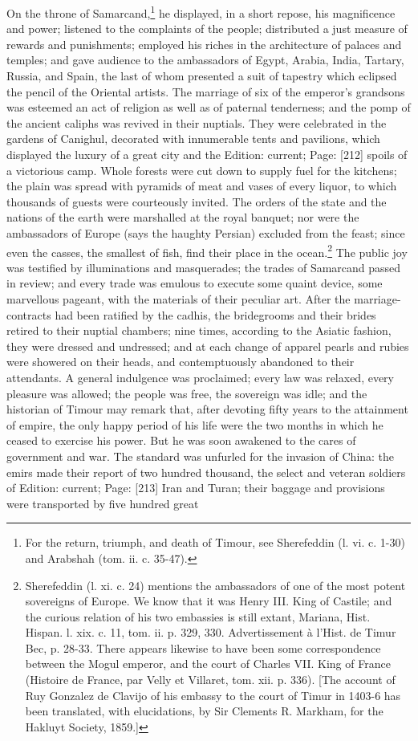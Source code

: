 On the throne of Samarcand,\footnote{For the return, triumph, and death of Timour, see Sherefeddin (l. vi. c. 1-30) and Arabshah (tom. ii. c. 35-47).} he displayed, in a short repose, his magnificence and power; listened to the complaints of the people; distributed a just measure of rewards and punishments; employed his riches in the architecture of palaces and temples; and gave audience to the ambassadors of Egypt, Arabia, India, Tartary, Russia, and Spain, the last of whom presented a suit of tapestry which eclipsed the pencil of the Oriental artists. The marriage of six of the emperor\texthebrew{}’s grandsons was esteemed an act of religion as well as of paternal tenderness; and the pomp of the ancient caliphs was revived in their nuptials. They were celebrated in the gardens of Canighul, decorated with innumerable tents and pavilions, which displayed the luxury of a great city and the Edition: current; Page: [212] spoils of a victorious camp. Whole forests were cut down to supply fuel for the kitchens; the plain was spread with pyramids of meat and vases of every liquor, to which thousands of guests were courteously invited. The orders of the state and the nations of the earth were marshalled at the royal banquet; nor were the ambassadors of Europe (says the haughty Persian) excluded from the feast; since even the casses, the smallest of fish, find their place in the ocean.\footnote{Sherefeddin (l. xi. c. 24) mentions the ambassadors of one of the most potent sovereigns of Europe. We know that it was Henry III. King of Castile; and the curious relation of his two embassies is still extant, Mariana, Hist. Hispan. l. xix. c. 11, tom. ii. p. 329, 330. Advertissement à l\texthebrew{}’Hist. de Timur Bec, p. 28-33. There appears likewise to have been some correspondence between the Mogul emperor, and the court of Charles VII. King of France (Histoire de France, par Velly et Villaret, tom. xii. p. 336). [The account of Ruy Gonzalez de Clavijo of his embassy to the court of Timur in 1403-6 has been translated, with elucidations, by Sir Clements R. Markham, for the Hakluyt Society, 1859.]} The public joy was testified by illuminations and masquerades; the trades of Samarcand passed in review; and every trade was emulous to execute some quaint device, some marvellous pageant, with the materials of their peculiar art. After the marriage-contracts had been ratified by the cadhis, the bridegrooms and their brides retired to their nuptial chambers; nine times, according to the Asiatic fashion, they were dressed and undressed; and at each change of apparel pearls and rubies were showered on their heads, and contemptuously abandoned to their attendants. A general indulgence was proclaimed; every law was relaxed, every pleasure was allowed; the people was free, the sovereign was idle; and the historian of Timour may remark that, after devoting fifty years to the attainment of empire, the only happy period of his life were the two months in which he ceased to exercise his power. But he was soon awakened to the cares of government and war. The standard was unfurled for the invasion of China: the emirs made their report of two hundred thousand, the select and veteran soldiers of Edition: current; Page: [213] Iran and Turan; their baggage and provisions were transported by five hundred great 